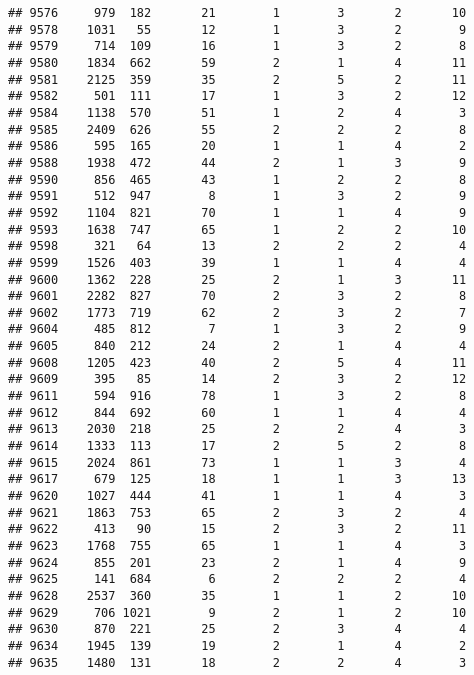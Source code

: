 \documentclass[]{article}
\begin{document}
\begin{verbatim}
## 9576     979  182       21        1        3       2       10
## 9578    1031   55       12        1        3       2        9
## 9579     714  109       16        1        3       2        8
## 9580    1834  662       59        2        1       4       11
## 9581    2125  359       35        2        5       2       11
## 9582     501  111       17        1        3       2       12
## 9584    1138  570       51        1        2       4        3
## 9585    2409  626       55        2        2       2        8
## 9586     595  165       20        1        1       4        2
## 9588    1938  472       44        2        1       3        9
## 9590     856  465       43        1        2       2        8
## 9591     512  947        8        1        3       2        9
## 9592    1104  821       70        1        1       4        9
## 9593    1638  747       65        1        2       2       10
## 9598     321   64       13        2        2       2        4
## 9599    1526  403       39        1        1       4        4
## 9600    1362  228       25        2        1       3       11
## 9601    2282  827       70        2        3       2        8
## 9602    1773  719       62        2        3       2        7
## 9604     485  812        7        1        3       2        9
## 9605     840  212       24        2        1       4        4
## 9608    1205  423       40        2        5       4       11
## 9609     395   85       14        2        3       2       12
## 9611     594  916       78        1        3       2        8
## 9612     844  692       60        1        1       4        4
## 9613    2030  218       25        2        2       4        3
## 9614    1333  113       17        2        5       2        8
## 9615    2024  861       73        1        1       3        4
## 9617     679  125       18        1        1       3       13
## 9620    1027  444       41        1        1       4        3
## 9621    1863  753       65        2        3       2        4
## 9622     413   90       15        2        3       2       11
## 9623    1768  755       65        1        1       4        3
## 9624     855  201       23        2        1       4        9
## 9625     141  684        6        2        2       2        4
## 9628    2537  360       35        1        1       2       10
## 9629     706 1021        9        2        1       2       10
## 9630     870  221       25        2        3       4        4
## 9634    1945  139       19        2        1       4        2
## 9635    1480  131       18        2        2       4        3

\end{verbatim}
\end{document}
